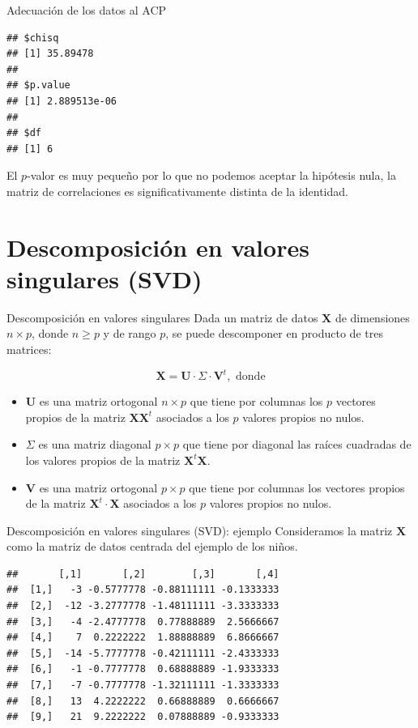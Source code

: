 \documentclass[
  ignorenonframetext,
]{beamer}
\providecommand{\tightlist}{%
  \setlength{\itemsep}{0pt}\setlength{\parskip}{0pt}}
\begin{document}
\begin{frame}[fragile]{Adecuación de los datos al ACP}
\begin{verbatim}
## $chisq
## [1] 35.89478
## 
## $p.value
## [1] 2.889513e-06
## 
## $df
## [1] 6
\end{verbatim}

El \(p\)-valor es muy pequeño por lo que no podemos aceptar la hipótesis
nula, la matriz de correlaciones es significativamente distinta de la
identidad.
\end{frame}

\hypertarget{descomposiciuxf3n-en-valores-singulares-svd}{%
\section{Descomposición en valores singulares
(SVD)}\label{descomposiciuxf3n-en-valores-singulares-svd}}

\begin{frame}{Descomposición en valores singulares}
\protect\hypertarget{descomposiciuxf3n-en-valores-singulares}{}
Dada un matriz de datos \(\mathbf{X}\) de dimensiones \(n\times p\),
donde \(n\geq p\) y de rango \(p\), se puede descomponer en producto de
tres matrices:

\[
\mathbf{X}=\mathbf{U}\cdot \Sigma\cdot \mathbf{V}^t, \mbox{ donde}
\]

\begin{itemize}
\tightlist
\item
  \(\mathbf{U}\) es una matriz ortogonal \(n\times p\) que tiene por
  columnas los \(p\) vectores propios de la matriz
  \(\mathbf{X}\mathbf{X}^t\) asociados a los \(p\) valores propios no
  nulos.
\item
  \({\Sigma}\) es una matriz diagonal \(p\times p\) que tiene por
  diagonal las raíces cuadradas de los valores propios de la matriz
  \(\mathbf{X}^t\mathbf{X}\).
\item
  \(\mathbf{V}\) es una matriz ortogonal \(p\times p\) que tiene por
  columnas los vectores propios de la matriz
  \(\mathbf{X}^t\cdot \mathbf{X}\) asociados a los \(p\) valores propios
  no nulos.
\end{itemize}
\end{frame}

\begin{frame}[fragile]{Descomposición en valores singulares (SVD):
ejemplo}
\protect\hypertarget{descomposiciuxf3n-en-valores-singulares-svd-ejemplo}{}
Consideramos la matriz \(\mathbf{X}\) como la matriz de datos centrada
del ejemplo de los niños.

\begin{verbatim}
##       [,1]       [,2]        [,3]       [,4]
##  [1,]   -3 -0.5777778 -0.88111111 -0.1333333
##  [2,]  -12 -3.2777778 -1.48111111 -3.3333333
##  [3,]   -4 -2.4777778  0.77888889  2.5666667
##  [4,]    7  0.2222222  1.88888889  6.8666667
##  [5,]  -14 -5.7777778 -0.42111111 -2.4333333
##  [6,]   -1 -0.7777778  0.68888889 -1.9333333
##  [7,]   -7 -0.7777778 -1.32111111 -1.3333333
##  [8,]   13  4.2222222  0.66888889  0.6666667
##  [9,]   21  9.2222222  0.07888889 -0.9333333
\end{verbatim}
\end{frame}
\end{document}
